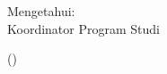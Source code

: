 \vspace{\baselineskip}

\begin{center}
	\begin{doublespace}
		Mengetahui:\\
		Koordinator Program Studi {\prodi}\\[3cm]
	\end{doublespace}
	({\kaprodi})\\
\end{center}
